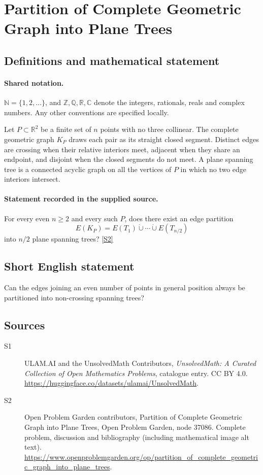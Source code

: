 \documentclass[11pt]{book}
\newcommand{\sref}[2]{\hyperlink{source:#1:#2}{[S#2]}}
\begin{document}
\section{Partition of Complete Geometric Graph into Plane Trees}\label{statement}

\subsection{Definitions and mathematical statement}

\paragraph{Shared notation.}$\mathbb N=\{1,2,\ldots\}$, and $\mathbb Z,\mathbb Q,\mathbb R,\mathbb C$ denote the integers, rationals, reals and complex numbers. Any other conventions are specified locally.


Let $P\subset\mathbb R^2$ be a finite set of $n$ points with no three collinear. The complete geometric graph $K_P$ draws each pair as its straight closed segment. Distinct edges are crossing when their relative interiors meet, adjacent when they share an endpoint, and disjoint when the closed segments do not meet. A plane spanning tree is a connected acyclic graph on all the vertices of $P$ in which no two edge interiors intersect.
\paragraph{Statement recorded in the supplied source.}
For every even $n\geq2$ and every such $P$, does there exist an edge partition
\[E(K_P)=E(T_1)\mathbin{\dot\cup}\cdots\mathbin{\dot\cup}E(T_{n/2})\]
into $n/2$ plane spanning trees? \sref{statement}{2}
\subsection{Short English statement}
Can the edges joining an even number of points in general position always be partitioned into non-crossing spanning trees?
\subsection{Sources}
\begin{description}
\item[\hypertarget{source:statement:1}{S1}] ULAM.AI and the UnsolvedMath Contributors, \emph{UnsolvedMath: A Curated Collection of Open Mathematics Problems}, catalogue entry. CC BY 4.0. \url{https://huggingface.co/datasets/ulamai/UnsolvedMath}.
\item[\hypertarget{source:statement:2}{S2}] Open Problem Garden contributors, Partition of Complete Geometric Graph into Plane Trees, Open Problem Garden, node 37086. Complete problem, discussion and bibliography (including mathematical image alt text). \url{https://www.openproblemgarden.org/op/partition_of_complete_geometric_graph_into_plane_trees}.
\end{description}
\label{end:statement}
\end{document}
